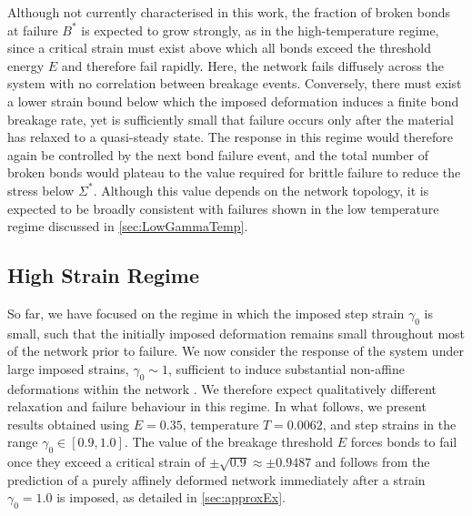 Although not currently characterised in this work, the fraction of broken bonds at failure $B^*$ is expected to grow strongly, as in the high-temperature regime, since a critical strain must exist above which all bonds exceed the threshold energy $E$ and therefore fail rapidly. Here, the network fails diffusely across the system with no correlation between breakage events. Conversely, there must exist a lower strain bound below which the imposed deformation induces a finite bond breakage rate, yet is sufficiently small that failure occurs only after the material has relaxed to a quasi-steady state. The response in this regime would therefore again be controlled by the next bond failure event, and the total number of broken bonds would plateau to the value required for brittle failure to reduce the stress below $\Sigma^*$. Although this value depends on the network topology, it is expected to be broadly consistent with failures shown in the low temperature regime discussed in \cref{sec:LowGammaTemp}.

\subsection{High Strain Regime}

So far, we have focused on the regime in which the imposed step strain $\gamma_0$ is small, such that the initially imposed deformation remains small throughout most of the network prior to failure. We now consider the response of the system under large imposed strains, $\gamma_0 \sim 1$, sufficient to induce substantial non-affine deformations within the network \cite{shivers_scaling_2019}. We therefore expect qualitatively different relaxation and failure behaviour in this regime. In what follows, we present results obtained using $E = 0.35$, temperature $T = 0.0062$, and step strains in the range $\gamma_0 \in [0.9,1.0]$. The value of the breakage threshold $E$ forces bonds to fail once they exceed a critical strain of $\pm\sqrt{0.9}\approx\pm0.9487$ and follows from the prediction of a purely affinely deformed network immediately after a strain $\gamma_0=1.0$ is imposed, as detailed in \cref{sec:approxEx}.

